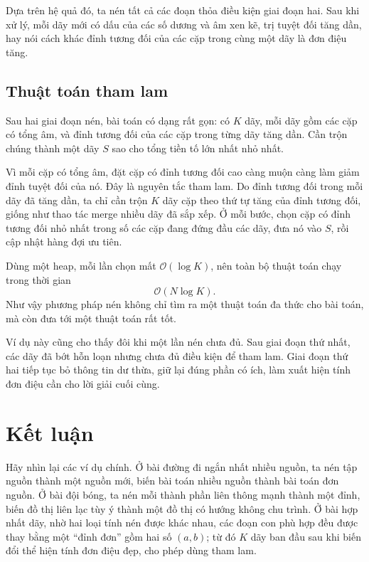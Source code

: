 \documentclass[11pt]{article}
\newcommand{\Oh}{\mathcal{O}}
\begin{document}
Dựa trên hệ quả đó, ta nén tất cả các đoạn thỏa điều kiện giai đoạn hai. Sau
khi xử lý, mỗi dãy mới có dấu của các số dương và âm xen kẽ, trị tuyệt đối
tăng dần, hay nói cách khác đỉnh tương đối của các cặp trong cùng một dãy là
đơn điệu tăng.

\subsection{Thuật toán tham lam}

Sau hai giai đoạn nén, bài toán có dạng rất gọn: có $K$ dãy, mỗi dãy gồm các
cặp có tổng âm, và đỉnh tương đối của các cặp trong từng dãy tăng dần. Cần
trộn chúng thành một dãy $S$ sao cho tổng tiền tố lớn nhất nhỏ nhất.

Vì mỗi cặp có tổng âm, đặt cặp có đỉnh tương đối cao càng muộn càng làm giảm
đỉnh tuyệt đối của nó. Đây là nguyên tắc tham lam. Do đỉnh tương đối trong
mỗi dãy đã tăng dần, ta chỉ cần trộn $K$ dãy cặp theo thứ tự tăng của đỉnh
tương đối, giống như thao tác merge nhiều dãy đã sắp xếp. Ở mỗi bước, chọn
cặp có đỉnh tương đối nhỏ nhất trong số các cặp đang đứng đầu các dãy, đưa
nó vào $S$, rồi cập nhật hàng đợi ưu tiên.

Dùng một heap, mỗi lần chọn mất $\Oh(\log K)$, nên toàn bộ thuật toán chạy
trong thời gian
\[
  \Oh(N\log K).
\]
Như vậy phương pháp nén không chỉ tìm ra một thuật toán đa thức cho bài toán,
mà còn đưa tới một thuật toán rất tốt.

Ví dụ này cũng cho thấy đôi khi một lần nén chưa đủ. Sau giai đoạn thứ nhất,
các dãy đã bớt hỗn loạn nhưng chưa đủ điều kiện để tham lam. Giai đoạn thứ hai
tiếp tục bỏ thông tin dư thừa, giữ lại đúng phần có ích, làm xuất hiện tính
đơn điệu cần cho lời giải cuối cùng.

\section{Kết luận}

Hãy nhìn lại các ví dụ chính. Ở bài đường đi ngắn nhất nhiều nguồn, ta nén tập
nguồn thành một nguồn mới, biến bài toán nhiều nguồn thành bài toán đơn
nguồn. Ở bài đội bóng, ta nén mỗi thành phần liên thông mạnh thành một đỉnh,
biến đồ thị liên lạc tùy ý thành một đồ thị có hướng không chu trình. Ở bài
hợp nhất dãy, nhờ hai loại tính nén được khác nhau, các đoạn con phù hợp đều
được thay bằng một ``đỉnh đơn'' gồm hai số $(a,b)$; từ đó $K$ dãy ban đầu sau
khi biến đổi thể hiện tính đơn điệu đẹp, cho phép dùng tham lam.
\end{document}
